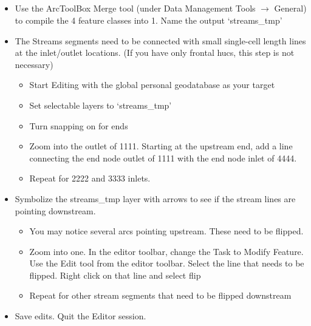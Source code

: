 \documentclass[letterpaper,10pt,english]{sphinxmanual}
\begin{document}
\subparagraph{}
\label{\detokenize{ex_2:merging-local-streams-into-global}}\begin{itemize}
\item {} 
Use the ArcToolBox Merge tool (under Data Management Tools \(\rightarrow\)  General) to compile the 4 feature classes into 1.  Name the output ‘streams\_tmp’

\item {} 
The Streams segments need to be connected with small single-cell length lines at the inlet/outlet locations. (If you have only frontal hucs, this step is not necessary)
\begin{itemize}
\item {} 
Start Editing with the global personal geodatabase as your target

\item {} 
Set selectable layers to ‘streams\_tmp’

\item {} 
Turn snapping on for ends

\item {} 
Zoom into the outlet of 1111. Starting at the upstream end, add a line connecting the end node outlet of 1111 with the end node inlet of  4444.

\item {} 
Repeat for 2222 and 3333 inlets.

\end{itemize}

\item {} 
Symbolize the streams\_tmp layer with arrows to see if the stream lines are pointing downstream.
\begin{itemize}
\item {} 
You may notice several arcs pointing upstream.  These need to be flipped.

\item {} 
Zoom into one.  In the editor toolbar, change the Task to Modify Feature.  Use the Edit tool from the editor toolbar.  Select the line that needs to be flipped.  Right click on that line and select flip

\item {} 
Repeat for other stream segments that need to be flipped downstream

\end{itemize}

\item {} 
Save edits.  Quit the Editor session.


\end{itemize}
\end{document}
